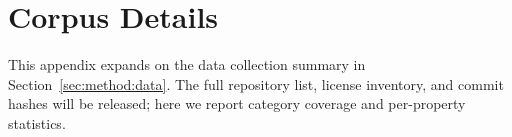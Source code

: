 %
%

\section{Corpus Details}
\label{app:data}

This appendix expands on the data collection summary in
Section~\ref{sec:method:data}. The full repository list, license inventory,
and commit hashes will be released; here we report category coverage and
per-property statistics.

